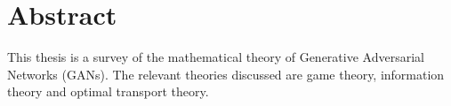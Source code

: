 \section{Abstract}

\vfill
\begin{center}
  \begin{minipage}[center]{0.7\linewidth}
    This thesis is a survey of the mathematical theory of Generative Adversarial
    Networks (GANs). The relevant theories discussed are game theory,
    information theory and optimal transport theory.
  \end{minipage}
\end{center}
\vfill

